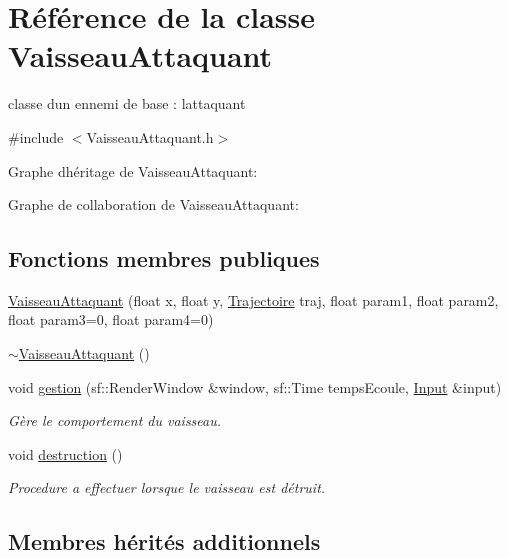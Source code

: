 \hypertarget{class_vaisseau_attaquant}{}\section{Référence de la classe Vaisseau\+Attaquant}
\label{class_vaisseau_attaquant}


classe d\textquotesingle{}un ennemi de base \+: l\textquotesingle{}attaquant  




{\ttfamily \#include $<$Vaisseau\+Attaquant.\+h$>$}



Graphe d\textquotesingle{}héritage de Vaisseau\+Attaquant\+:


Graphe de collaboration de Vaisseau\+Attaquant\+:
\subsection*{Fonctions membres publiques}
\begin{DoxyCompactItemize}
\item 
\hyperlink{class_vaisseau_attaquant_a58fd4ab933dd101db82b9287e0c0aafa}{Vaisseau\+Attaquant} (float x, float y, \hyperlink{_trajectoire_8h_afa7f6e8323d7ee755d93cd1f6019dd95}{Trajectoire} traj, float param1, float param2, float param3=0, float param4=0)
\item 
\hyperlink{class_vaisseau_attaquant_a2707dcc90692ba6132ec6aeb659d3620}{$\sim$\+Vaisseau\+Attaquant} ()
\item 
void \hyperlink{class_vaisseau_attaquant_ad95d76e5973affa6ef287edd7ad5310e}{gestion} (sf\+::\+Render\+Window \&window, sf\+::\+Time temps\+Ecoule, \hyperlink{_input_8h_a5588d60d674991c719a8df848313e966}{Input} \&input)
\begin{DoxyCompactList}\small\item\em Gère le comportement du vaisseau. \end{DoxyCompactList}\item 
void \hyperlink{class_vaisseau_attaquant_af804e1fd491301c2385e10d88f4892a6}{destruction} ()
\begin{DoxyCompactList}\small\item\em Procedure a effectuer lorsque le vaisseau est détruit. \end{DoxyCompactList}\end{DoxyCompactItemize}
\subsection*{Membres hérités additionnels}


